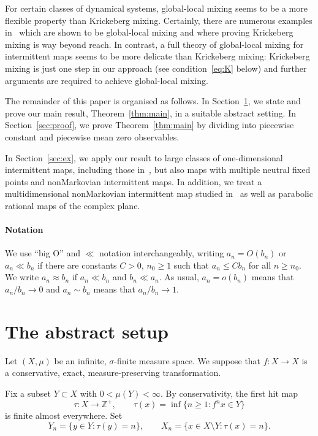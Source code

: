 \documentclass[12pt]{article}
\numberwithin{equation}{section}
\newcommand{\Z}{{\mathbb Z}}
\begin{document}
\begin{rmk} For certain classes of dynamical systems, global-local mixing seems to be a more flexible property than Krickeberg mixing. Certainly, there are numerous examples in~\cite{DolgopyatNandori22} which are shown to be global-local mixing and where proving Krickeberg mixing is way beyond reach.
In contrast, a full theory of global-local mixing for intermittent maps seems to be more delicate than Krickeberg mixing: Krickeberg mixing is just one step in our approach (see condition~\eqref{eq:K} below) and further arguments are required to achieve global-local mixing.
\end{rmk}

The remainder of this paper is organised as follows.
In Section~\ref{sec:main}, we state and prove our main result, Theorem~\ref{thm:main}, in a suitable abstract setting.
In Section~\ref{sec:proof}, we prove Theorem~\ref{thm:main} by dividing into piecewise constant and piecewise mean zero observables.

In Section~\ref{sec:ex}, we apply our result to large classes of one-dimensional intermittent maps, including those in~\cite{BonannoLenci21}, but also maps with multiple neutral fixed points and nonMarkovian intermittent maps.
In addition, we treat a multidimensional nonMarkovian intermittent map studied in~\cite{EMV21} as well as parabolic rational maps of the complex plane.

\vspace{-2ex}
\paragraph{Notation}
We use ``big O'' and $\ll$ notation interchangeably, writing $a_n=O(b_n)$ or $a_n\ll b_n$
if there are constants $C>0$, $n_0\ge1$ such that
$a_n\le Cb_n$ for all $n\ge n_0$.
We write $a_n\approx b_n$ if $a_n\ll b_n$ and $b_n\ll a_n$.
As usual, $a_n=o(b_n)$ means that $a_n/b_n\to0$ and
$a_n\sim b_n$ means that $a_n/b_n\to1$.




\section{The abstract setup}
\label{sec:main}

Let $(X,\mu)$ be an infinite, $\sigma$-finite measure space.  We suppose that 
$f:X\to X$ is a conservative, exact, measure-preserving transformation.

Fix a subset $Y\subset X$ with $0<\mu(Y)<\infty$. 
By conservativity, the first hit map
\[
\tau:X\to\Z^+, \qquad \tau(x)=\inf\{n\ge1:f^nx\in Y\}
\]
is finite almost everywhere.
Set
\[
Y_n=\{y\in Y: \tau(y)=n\}, 
\qquad
X_n=\{x\in X\setminus Y:\tau(x)=n\}.
\]
\end{document}
